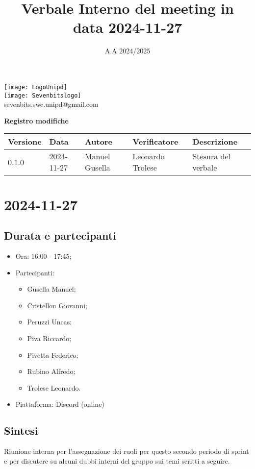\documentclass[10pt]{article}
\title{Verbale Interno del meeting in data 2024-11-27}
\date{A.A 2024/2025}
\begin{document}
\maketitle
\begin{center}
\texttt{[image: LogoUnipd]}\\
\texttt{[image: Sevenbitslogo]}\\
sevenbits.swe.unipd@gmail.com\\
\vspace{2mm}

\textbf{Registro modifiche}\\
\vspace{2mm}
\begin{tabularx}{\textwidth}{|l|l|l|l|X|}
\hline
\textbf{Versione} & \textbf{Data} & \textbf{Autore} & \textbf{Verificatore} & \textbf{Descrizione} \\
\hline
0.1.0 & 2024-11-27 & Manuel Gusella & Leonardo Trolese & Stesura del verbale\\
\hline
\end{tabularx}
\end{center}

\newpage
\tableofcontents
\newpage
\section{2024-11-27}
\subsection{Durata e partecipanti}
\begin{itemize}
\item Ora: 16:00 - 17:45;
\item Partecipanti: 	
	\begin{itemize}
	\item Gusella Manuel;
	\item Cristellon Giovanni;
	\item Peruzzi Uncas;
	\item Piva Riccardo;
	\item Pivetta Federico;
	\item Rubino Alfredo;
	\item Trolese Leonardo.
	\end{itemize}
\item Piattaforma: Discord (online)
\end{itemize}
\subsection{Sintesi}
Riunione interna per l'assegnazione dei ruoli per questo secondo periodo di sprint e per discutere su alcuni dubbi interni del gruppo sui temi scritti a seguire.
\end{document}
